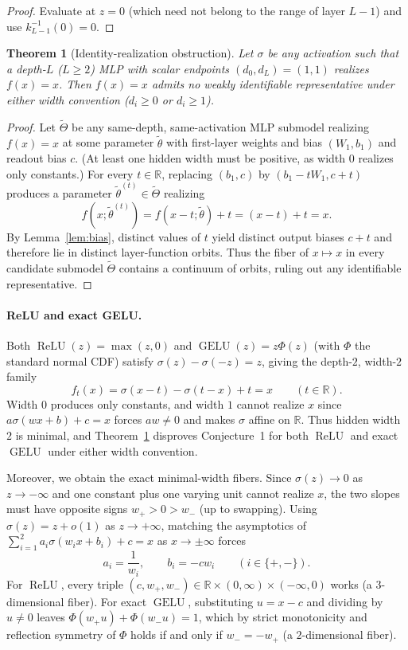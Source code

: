 \documentclass[11pt]{article}
\theoremstyle{plain}
\newtheorem{theorem}{Theorem}
\theoremstyle{definition}
\theoremstyle{remark}
\DeclareMathOperator{\GELU}{GELU}
\DeclareMathOperator{\ReLU}{ReLU}
\begin{document}
\begin{proof}
Evaluate at $z = 0$ (which need not belong to the range of layer $L-1$) and use $k_{L-1}^{-1}(0) = 0$.
\end{proof}

\begin{theorem}[Identity-realization obstruction]\label{thm:id}
Let $\sigma$ be any activation such that a depth-$L$ ($L \ge 2$) MLP with scalar endpoints $(d_0, d_L) = (1, 1)$ realizes $f(x) = x$. Then $f(x) = x$ admits no weakly identifiable representative under either width convention ($d_i \ge 0$ or $d_i \ge 1$).
\end{theorem}

\begin{proof}
Let $\tilde{\Theta}$ be any same-depth, same-activation MLP submodel realizing $f(x) = x$ at some parameter $\tilde{\theta}$ with first-layer weights and bias $(W_1, b_1)$ and readout bias $c$. (At least one hidden width must be positive, as width $0$ realizes only constants.) For every $t \in \mathbb{R}$, replacing $(b_1, c)$ by $(b_1 - t W_1, c + t)$ produces a parameter $\tilde{\theta}^{(t)} \in \tilde{\Theta}$ realizing
\[
f(x; \tilde{\theta}^{(t)}) = f(x - t; \tilde{\theta}) + t = (x - t) + t = x.
\]
By Lemma~\ref{lem:bias}, distinct values of $t$ yield distinct output biases $c + t$ and therefore lie in distinct layer-function orbits. Thus the fiber of $x \mapsto x$ in every candidate submodel $\tilde{\Theta}$ contains a continuum of orbits, ruling out any identifiable representative.
\end{proof}

\paragraph{ReLU and exact GELU.}
Both $\ReLU(z) = \max(z, 0)$ and $\GELU(z) = z\Phi(z)$ (with $\Phi$ the standard normal CDF) satisfy $\sigma(z) - \sigma(-z) = z$, giving the depth-$2$, width-$2$ family
\[
f_t(x) = \sigma(x - t) - \sigma(t - x) + t = x \qquad (t \in \mathbb{R}).
\]
Width $0$ produces only constants, and width $1$ cannot realize $x$ since $a\sigma(wx + b) + c = x$ forces $aw \neq 0$ and makes $\sigma$ affine on $\mathbb{R}$. Thus hidden width $2$ is minimal, and Theorem~\ref{thm:id} disproves Conjecture~1 for both $\ReLU$ and exact $\GELU$ under either width convention.

Moreover, we obtain the exact minimal-width fibers. Since $\sigma(z) \to 0$ as $z \to -\infty$ and one constant plus one varying unit cannot realize $x$, the two slopes must have opposite signs $w_+ > 0 > w_-$ (up to swapping). Using $\sigma(z) = z + o(1)$ as $z \to +\infty$, matching the asymptotics of $\sum_{i=1}^2 a_i \sigma(w_i x + b_i) + c = x$ as $x \to \pm\infty$ forces
\[
a_i = \frac{1}{w_i}, \qquad b_i = -c w_i \qquad (i \in \{+, -\}).
\]
For $\ReLU$, every triple $(c, w_+, w_-) \in \mathbb{R} \times (0, \infty) \times (-\infty, 0)$ works (a $3$-dimensional fiber). For exact $\GELU$, substituting $u = x - c$ and dividing by $u \neq 0$ leaves $\Phi(w_+ u) + \Phi(w_- u) = 1$, which by strict monotonicity and reflection symmetry of $\Phi$ holds if and only if $w_- = -w_+$ (a $2$-dimensional fiber).
\end{document}
